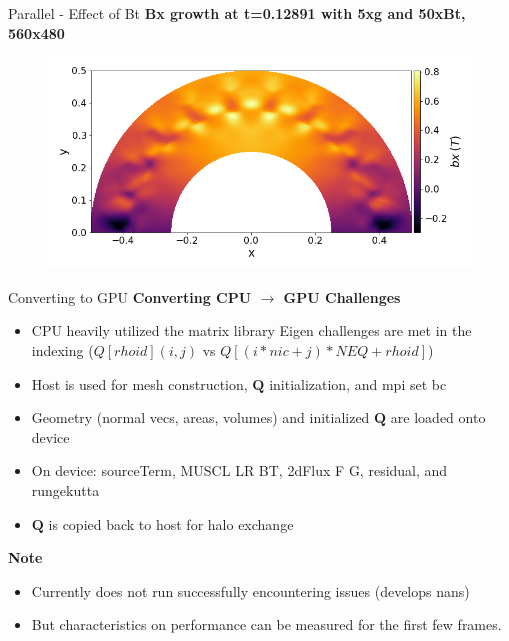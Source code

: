 \begin{frame}[t]{Parallel - Effect of Bt}
  \textbf{Bx growth at t=0.12891 with 5xg and 50xBt, 560x480}
 \begin{figure}[!htbp]
   \includegraphics[width=0.85\linewidth]{fig/560x480cpuBx5_bx}
   \centering
 \end{figure}
\end{frame}



\begin{frame}[t]{Converting to GPU}
  \textbf{Converting CPU $\rightarrow$ GPU Challenges}
  \begin{itemize}
    \item CPU heavily utilized the matrix library Eigen challenges are met in the indexing ($Q[rhoid](i,j)$ vs $Q[(i*nic+j)*NEQ+rhoid]$)
    \item Host is used for mesh construction, $\mathbf{Q}$ initialization, and mpi set bc
    \item Geometry (normal vecs, areas, volumes) and initialized $\mathbf{Q}$ are loaded onto device
    \item On device: sourceTerm, MUSCL LR BT, 2dFlux F G, residual, and rungekutta
    \item $\mathbf{Q}$ is copied back to host for halo exchange
  \end{itemize}

  \textbf{Note}
  \begin{itemize}
    \item Currently does not run successfully encountering issues (develops nans)
    \item But characteristics on performance can be measured for the first few frames. 
  \end{itemize}
\end{frame}




